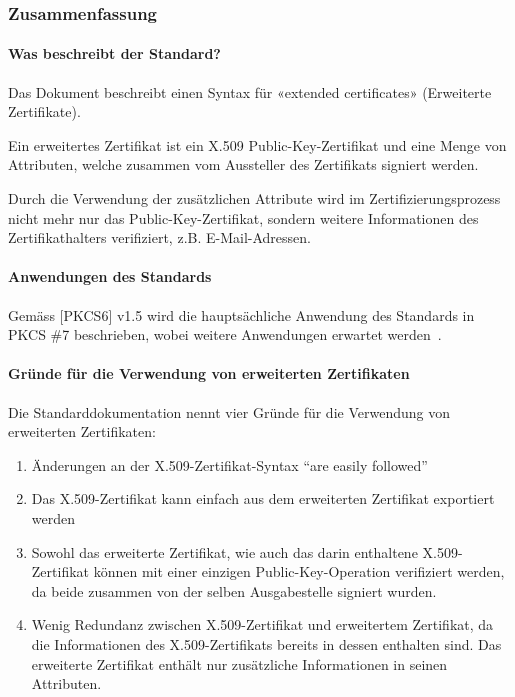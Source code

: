 \documentclass[10pt,a4paper]{article}
\begin{document}
\subsubsection{Zusammenfassung}

\paragraph{Was beschreibt der Standard?}
Das Dokument beschreibt einen Syntax für «extended certificates» (Erweiterte Zertifikate).

Ein erweitertes Zertifikat ist ein X.509 Public-Key-Zertifikat und eine Menge von
Attributen, welche zusammen vom Aussteller des Zertifikats signiert werden.

Durch die Verwendung der zusätzlichen Attribute wird im Zertifizierungsprozess nicht mehr
nur das Public-Key-Zertifikat, sondern weitere Informationen des Zertifikathalters
verifiziert, z.B. E-Mail-Adressen.

\paragraph{Anwendungen des Standards}
Gemäss [PKCS6] v1.5 wird die hauptsächliche Anwendung des Standards in PKCS \#7
beschrieben, wobei weitere Anwendungen erwartet werden~\cite[S.1]{pkcs6}.


\paragraph{Gründe für die Verwendung von erweiterten Zertifikaten}
Die Standarddokumentation nennt vier Gründe für die Verwendung von erweiterten
Zertifikaten:
\begin{enumerate}
    \item Änderungen an der X.509-Zertifikat-Syntax "`are easily followed"'
    \item Das X.509-Zertifikat kann einfach aus dem erweiterten Zertifikat exportiert
        werden
    \item Sowohl das erweiterte Zertifikat, wie auch das darin enthaltene X.509-Zertifikat
        können mit einer einzigen Public-Key-Operation verifiziert werden, da beide
        zusammen von der selben Ausgabestelle signiert wurden.
    \item Wenig Redundanz zwischen X.509-Zertifikat und erweitertem Zertifikat, da die
        Informationen des X.509-Zertifikats bereits in dessen enthalten sind. Das
        erweiterte Zertifikat enthält nur zusätzliche Informationen in seinen Attributen.
\end{enumerate}
\end{document}
